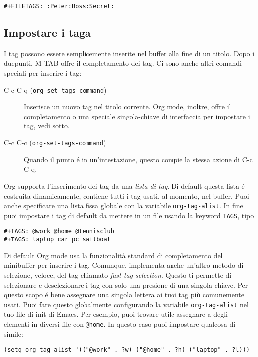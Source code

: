 \documentclass[11pt]{article}
\begin{document}
\begin{verbatim}
#+FILETAGS: :Peter:Boss:Secret:
\end{verbatim}

\subsection*{Impostare i taga}
\label{sec:org8d5182e}
I tag possono essere semplicemente inserite nel buffer alla fine di un
titolo. Dopo i duepunti, M-TAB offre il completamento dei
tag. Ci sono anche altri comandi speciali per inserire i tag:

\begin{description}
\item[{C-c C-q (\texttt{org-set-tags-command})}] Inserisce un nuovo tag nel titolo corrente. Org mode, inoltre, offre
il completamento o una speciale singola-chiave di interfaccia per
impostare i tag, vedi sotto.

\item[{C-c C-c (\texttt{org-set-tags-command})}] Quando il punto é in un'intestazione, questo compie la stessa azione di
C-c C-q.
\end{description}

Org supporta l'inserimento dei tag da una \emph{lista di tag}. Di default
questa lista é costruita dinamicamente, contiene tutti i tag usati, al
momento, nel buffer. Puoi anche specificare una lista fissa globale
con la variabile \texttt{org-tag-alist}. In fine puoi impostare i tag di
default da mettere in un file usando la keyword \texttt{TAGS}, tipo

\begin{verbatim}
#+TAGS: @work @home @tennisclub
#+TAGS: laptop car pc sailboat
\end{verbatim}


Di default Org mode usa la funzionalità standard di completamento del minibuffer per inserire i
tag. Comunque, implementa anche un'altro metodo di selezione, veloce, del tag chiamato \emph{fast tag
selection}. Questo ti permette di selezionare e deselezionare i tag con solo una presione di
una singola chiave. Per questo scopo é bene assegnare una singola lettera ai tuoi tag più
comunemente usati. Puoi fare questo globalmente configurando la variabile \texttt{org-tag-alist} nel tuo file
di init di Emacs. Per esempio, puoi trovare utile assegnare a degli elementi in diversi file con
\texttt{@home}. In questo caso puoi impostare qualcosa di simile:

\begin{verbatim}
(setq org-tag-alist '(("@work" . ?w) ("@home" . ?h) ("laptop" . ?l)))
\end{verbatim}
\end{document}
